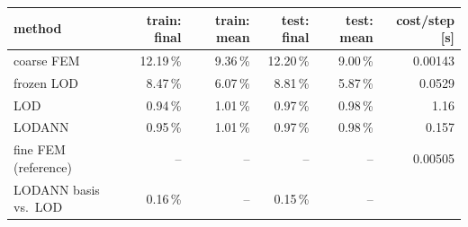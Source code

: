 \begin{tabular}{lrrrrr}
\hline
method & train: final & train: mean & test: final & test: mean & cost/step [s]\\
\hline
coarse FEM & 12.19\,\% & 9.36\,\% & 12.20\,\% & 9.00\,\% & 0.00143\\
frozen LOD & 8.47\,\% & 6.07\,\% & 8.81\,\% & 5.87\,\% & 0.0529\\
LOD & 0.94\,\% & 1.01\,\% & 0.97\,\% & 0.98\,\% & 1.16\\
LODANN & 0.95\,\% & 1.01\,\% & 0.97\,\% & 0.98\,\% & 0.157\\
\hline
fine FEM (reference) & -- & -- & -- & -- & 0.00505\\
\hline
LODANN basis vs.\ LOD & 0.16\,\% & -- & 0.15\,\% & -- & \\
\hline
\end{tabular}
